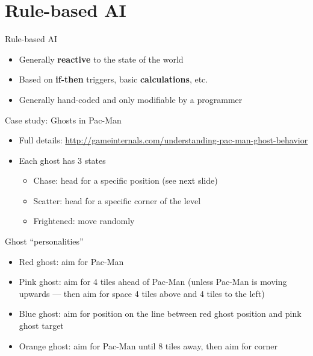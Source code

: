 \part{Rule-based AI}
\frame{\partpage}

\begin{frame}{Rule-based AI}
	\begin{itemize}
		\pause\item Generally \textbf{reactive} to the state of the world
		\pause\item Based on \textbf{if-then} triggers, basic \textbf{calculations}, etc.
		\pause\item Generally hand-coded and only modifiable by a programmer
	\end{itemize}
\end{frame}

\begin{frame}{Case study: Ghosts in Pac-Man}
	\begin{itemize}
		\pause\item Full details: \url{http://gameinternals.com/understanding-pac-man-ghost-behavior}
		\pause\item Each ghost has 3 states
			\begin{itemize}
				\pause\item Chase: head for a specific position (see next slide)
				\pause\item Scatter: head for a specific corner of the level
				\pause\item Frightened: move randomly
			\end{itemize}
	\end{itemize}
\end{frame}

\begin{frame}{Ghost ``personalities''}
	\begin{itemize}
		\pause\item Red ghost: aim for Pac-Man
		\pause\item Pink ghost: aim for 4 tiles ahead of Pac-Man (unless Pac-Man is moving upwards --- then aim for space 4 tiles above and 4 tiles to the left)
		\pause\item Blue ghost: aim for position on the line between red ghost position and pink ghost target
		\pause\item Orange ghost: aim for Pac-Man until 8 tiles away, then aim for corner
	\end{itemize}
\end{frame}

